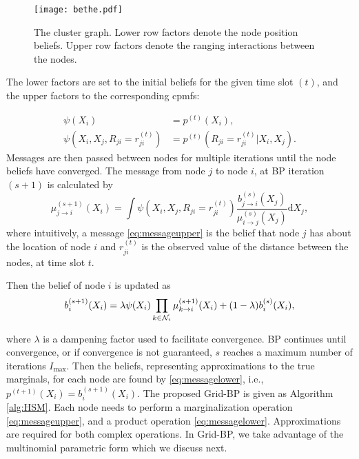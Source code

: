 \documentclass[10pt, final, journal]{IEEEtran}
\begin{document}
\begin{figure}[!ht]
\centering
\texttt{[image: bethe.pdf]}
\caption{The cluster graph. Lower row factors denote the node position beliefs. Upper row factors denote the ranging interactions between the nodes.}\label{fig:clustergraph}
\end{figure}

The lower factors are set to the initial beliefs for the given time slot $(t)$, and the upper factors to the corresponding cpmfs:

\begin{align}
\psi(X_{i})&=p^{(t)}(X_{i}),\\
\psi( X_{i},X_{j},R_{ji}= r^{(t)}_{ji})&= p^{(t)}(R_{ji}=r^{(t)}_{ji}|X_{i}, X_{j}).
\end{align}
Messages are then passed between nodes for multiple iterations until the node beliefs have converged. The message from node $j$ to node $i$, at BP iteration $(s+1)$ is calculated by
\begin{equation}\label{eq:messageupper}
\mu^{(s+1)}_{j \rightarrow i}(X_{i}) = \int \psi(X_{i},X_{j},R_{ji}=r^{(t)}_{ji}) \frac{b^{(s)}_{j\rightarrow i}(X_{j})}{\mu^{(s)}_{i\rightarrow j}(X_{j}) }\text{d} X_{j},
\end{equation}
where intuitively, a message \eqref{eq:messageupper} is the belief that node $j$ has about the location of node $i$  and $r^{(t)}_{ji}$ is the observed value of the distance between the nodes, at time slot $t$.

Then the belief of node $i$ is updated as
\begin{equation}
b^{(s+1)}_{i}(X_{i})= \lambda\psi(X_{i})\prod\limits_{k \in {\cal N}_{i}} \mu^{(s+1)}_{k \rightarrow i}(X_{i})
+ (1-\lambda)b^{(s)}_{i}(X_{i}), \label{eq:messagelower}
\end{equation}

where $\lambda$ is a dampening factor used to facilitate convergence.
BP continues until convergence, or if convergence is not guaranteed, $s$ reaches a maximum number of iterations $I_{\text{max}}$. Then the beliefs, representing approximations to the true marginals, for each node are found by \eqref{eq:messagelower}, i.e., $p^{(t+1)}(X_i)=b^{(s+1)}_{i}(X_{i})$. The proposed Grid-BP is given as Algorithm \ref{alg:HSM}. Each node needs to perform a marginalization operation \eqref{eq:messageupper}, and a product operation \eqref{eq:messagelower}. Approximations are required for both complex operations. In Grid-BP, we take advantage of the multinomial parametric form which we discuss next.
\end{document}
